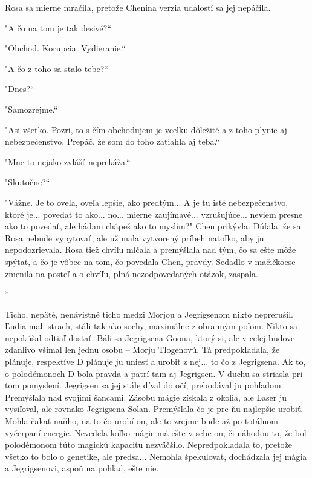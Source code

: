 \documentclass{book}
\begin{document}
Rosa sa mierne mračila, pretože Chenina verzia udalostí sa jej nepáčila.

"$ $A čo na tom je tak desivé?“

"$ $Obchod. Korupcia. Vydieranie.“

"$ $A čo z toho sa stalo tebe?“

"$ $Dnes?“

"$ $Samozrejme.“

"$ $Asi všetko. Pozri, to s čím obchodujem je vcelku dôležité a z toho plynie aj nebezpečenstvo. Prepáč, že som do toho zatiahla aj teba.“

"$ $Mne to nejako zvlášť neprekáža.“

"$ $Skutočne?“

"$ $Vážne. Je to oveľa, oveľa lepšie, ako predtým... A je tu isté nebezpečenstvo, ktoré je... povedať to ako... no... mierne zaujímavé... vzrušujúce... neviem presne ako to povedať, ale hádam chápeš ako to myslím?"$ $ Chen prikývla. Dúfala, že sa Rosa nebude vypytovať, ale už mala vytvorený príbeh natoľko, aby ju nepodozrievala. Rosa tiež chvíľu mlčala a premýšľala nad tým, čo sa ešte môže spýtať, a čo je vôbec na tom, čo povedala Chen, pravdy. Sedadlo v mačičkoese zmenila na posteľ a o chvíľu, plná nezodpovedaných otázok, zaspala.

\begin{center}

*

\end{center}

Ticho, nepäté, nenávistné ticho medzi Morjou a Jegrigsenom nikto neprerušil. Ľudia mali strach, stáli tak ako sochy, maximálne z obranným poľom. Nikto sa nepokúšal odtiaľ dostať. Báli sa Jegrigsena Goona, ktorý si, ale v celej budove zdanlivo všímal len jednu osobu – Morju Tlogenovú. Tá predpokladala, že plánuje, respektíve D plánuje ju uniesť a urobiť z nej... to čo z Jegrigsena. Ak to, o polodémonoch D bola pravda a patrí tam aj Jegrigsen. V duchu sa striasla pri tom pomyslení. Jegrigsen sa jej stále díval do očí, prebodával ju pohľadom. Premýšľala nad svojimi šancami. Zásobu mágie získala z okolia, ale Laser ju vysiľoval, ale rovnako Jegrigsena Solan. Premýšľala čo je pre ňu najlepšie urobiť. Mohla čakať naňho, na to čo urobí on, ale to zrejme bude až po totálnom vyčerpaní energie. Nevedela koľko mágie má ešte v sebe on, či náhodou to, že bol polodémonom túto magickú kapacitu nezväčšilo. Nepredpokladala to, pretože všetko to bolo o genetike, ale predsa... Nemohla špekulovať, dochádzala jej mágia a Jegrigsenovi, aspoň na pohľad, ešte nie.
\end{document}
